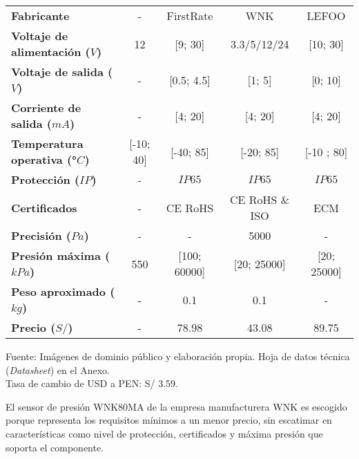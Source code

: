 \begin{mytable}[H]
\begin{tabular}{l|c|c|c|c|}
\begin{minipage}{\mythirdmaxsizeofcontenttable}
 		\end{minipage}	\\ \hline	
 		\multicolumn{1}{|l|}{\textbf{Fabricante}} & - & FirstRate & WNK & LEFOO \\ \hline
 		\multicolumn{1}{|l|}{\textbf{Voltaje de alimentación ($V$)}} & 12 & [9; 30] & 3.3/5/12/24 & [10; 30] \\ \hline
 		\multicolumn{1}{|l|}{\textbf{Voltaje de salida ($V$)}} & - & [0.5; 4.5] & [1; 5] & [0; 10] \\ \hline
 		\multicolumn{1}{|l|}{\textbf{Corriente de salida ($mA$)}} & - & [4; 20] & [4; 20] & [4; 20] \\ \hline
 		\multicolumn{1}{|l|}{\textbf{Temperatura operativa (°$C$)}} & [-10; 40] & [-40; 85] & [-20; 85] & [-10 ; 80] \\ \hline
 		\multicolumn{1}{|l|}{\textbf{Protección ($IP$)}} & - & $IP65$ & $IP65$ & $IP65$ \\ \hline
 		\multicolumn{1}{|l|}{\textbf{Certificados}} & - & CE RoHS & CE RoHS \& ISO & ECM \\ \hline
 		\multicolumn{1}{|l|}{\textbf{Precisión ($Pa$)}} & - & - & 5000 & - \\ \hline
 		\multicolumn{1}{|l|}{\textbf{Presión máxima ($kPa$)}} & 550 & [100; 60000] & [20; 25000] & [20; 25000] \\ \hline
 		\multicolumn{1}{|l|}{\textbf{Peso aproximado ($kg$)}} & - & 0.1 & 0.1 & - \\ \hline
 		\multicolumn{1}{|l|}{\textbf{Precio ($S/$)}} & - & 78.98 & 43.08 & 89.75 \\ \hline		
 	\end{tabular}	
 	\begin{myflushcenteraftertable}			
 		Fuente: Imágenes de dominio público y elaboración propia. Hoja de datos técnica (\textit{Datasheet}) en el Anexo. \\
 		Tasa de cambio de USD a PEN: S/ 3.59.
 	\end{myflushcenteraftertable}
\end{mytable}

El sensor de presión WNK80MA de la empresa manufacturera WNK es escogido porque representa los requisitos mínimos a un menor precio, sin escatimar en características como nivel de protección, certificados y máxima presión que soporta el componente.	

\pagestyle{myportland}
\doublespacing

